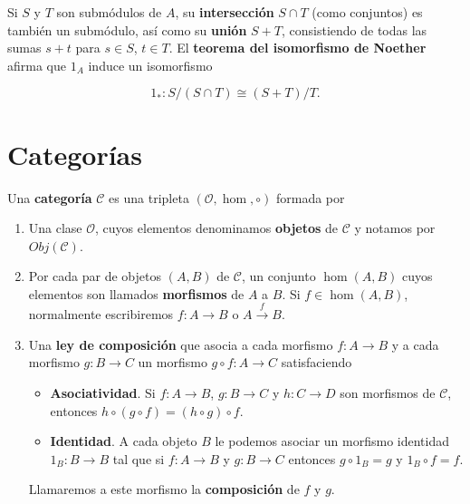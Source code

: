 Si \(S\) y \(T\) son submódulos de \(A\), su \textbf{intersección} \(S \cap T\) (como conjuntos) es también un submódulo, así como su \textbf{unión} \(S + T\), consistiendo de todas las sumas \(s + t\) para \(s \in S\), \(t \in T\). El \textbf{teorema del isomorfismo de Noether} afirma que \(1_{A}\) induce un isomorfismo

\[ 1_{\ast}: S/(S \cap T) \cong (S + T)/T. \]

\section{Categorías}

\begin{definicion}
	Una \textbf{categoría} $\mathcal{C}$ es una tripleta $(\mathcal{O}, \hom, \circ)$ formada por
	\begin{enumerate}
		\item Una clase $\mathcal{O}$, cuyos elementos denominamos \textbf{objetos} de $\mathcal{C}$ y notamos por $Obj(\mathcal{C})$.
		\item Por cada par de objetos $(A,B)$ de $\mathcal{C}$, un conjunto $\hom(A,B)$ cuyos elementos son llamados \textbf{morfismos} de $A$ a $B$. Si $f \in \hom(A,B)$, normalmente escribiremos $f: A \rightarrow B$ o $A \xrightarrow{f} B$.
		\item Una \textbf{ley de composición} que asocia a cada morfismo $f: A \rightarrow B$ y a cada morfismo $g: B \rightarrow C$ un morfismo $g \circ f : A \rightarrow C$ satisfaciendo
		\begin{itemize}
			\item \textbf{Asociatividad}. Si $f: A \rightarrow B$, $g: B \rightarrow C$ y $h : C \rightarrow D$ son morfismos de $\mathcal{C}$, entonces $h \circ (g \circ f) = (h \circ g) \circ f$.
			\item \textbf{Identidad}. A cada objeto $B$ le podemos asociar un morfismo identidad $1_B : B \rightarrow B$ tal que si $f: A \rightarrow B$ y $g: B \rightarrow C$ entonces $g \circ 1_B = g$ y $1_B \circ f = f$.
		\end{itemize}
		Llamaremos a este morfismo la \textbf{composición} de $f$ y $g$.
	\end{enumerate}
\end{definicion}

